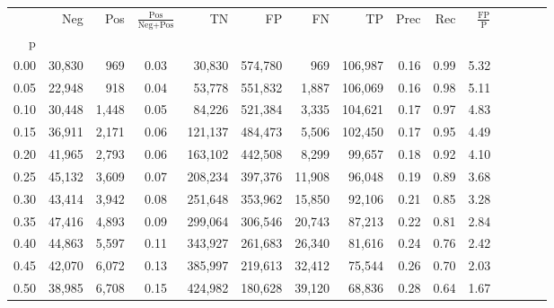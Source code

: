\begin{tabular}{rrrcrrrrrrrrrrr}
\toprule
{} &     Neg &    Pos & $\frac{\text{Pos}}{\text{Neg}+\text{Pos}}$ &       TN &       FP &       FN &       TP &  Prec &   Rec & $\frac{\text{FP}}{\text{P}}$ \\
p    &         &        &                                            &          &          &          &          &       &       &                              \\
\midrule
0.00 &  30,830 &    969 &                                       0.03 &   30,830 &  574,780 &      969 &  106,987 &  0.16 &  0.99 &                         5.32 \\
0.05 &  22,948 &    918 &                                       0.04 &   53,778 &  551,832 &    1,887 &  106,069 &  0.16 &  0.98 &                         5.11 \\
0.10 &  30,448 &  1,448 &                                       0.05 &   84,226 &  521,384 &    3,335 &  104,621 &  0.17 &  0.97 &                         4.83 \\
0.15 &  36,911 &  2,171 &                                       0.06 &  121,137 &  484,473 &    5,506 &  102,450 &  0.17 &  0.95 &                         4.49 \\
0.20 &  41,965 &  2,793 &                                       0.06 &  163,102 &  442,508 &    8,299 &   99,657 &  0.18 &  0.92 &                         4.10 \\
0.25 &  45,132 &  3,609 &                                       0.07 &  208,234 &  397,376 &   11,908 &   96,048 &  0.19 &  0.89 &                         3.68 \\
0.30 &  43,414 &  3,942 &                                       0.08 &  251,648 &  353,962 &   15,850 &   92,106 &  0.21 &  0.85 &                         3.28 \\
0.35 &  47,416 &  4,893 &                                       0.09 &  299,064 &  306,546 &   20,743 &   87,213 &  0.22 &  0.81 &                         2.84 \\
0.40 &  44,863 &  5,597 &                                       0.11 &  343,927 &  261,683 &   26,340 &   81,616 &  0.24 &  0.76 &                         2.42 \\
0.45 &  42,070 &  6,072 &                                       0.13 &  385,997 &  219,613 &   32,412 &   75,544 &  0.26 &  0.70 &                         2.03 \\
0.50 &  38,985 &  6,708 &                                       0.15 &  424,982 &  180,628 &   39,120 &   68,836 &  0.28 &  0.64 &                         1.67 \\

\end{tabular}
